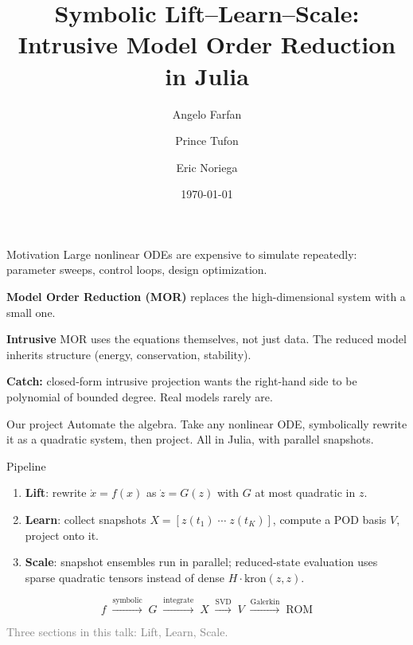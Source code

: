 \documentclass[aspectratio=169,10pt]{beamer}
\title[SymbolicMOR]{Symbolic Lift--Learn--Scale: \\ Intrusive Model Order Reduction in Julia}
\author{Angelo Farfan \and Prince Tufon \and Eric Noriega}
\institute{18.337 Final Project}
\date{\today}
\begin{document}
\begin{frame}
  \titlepage
\end{frame}

\begin{frame}{Motivation}
  Large nonlinear ODEs are expensive to simulate repeatedly: parameter sweeps, control loops, design optimization.

  \medskip
  \textbf{Model Order Reduction (MOR)} replaces the high-dimensional system with a small one.

  \medskip
  \textbf{Intrusive} MOR uses the equations themselves, not just data. The reduced model inherits structure (energy, conservation, stability).

  \medskip
  \textbf{Catch:} closed-form intrusive projection wants the right-hand side to be polynomial of bounded degree. Real models rarely are.

  \medskip
  \begin{block}{Our project}
    Automate the algebra. Take any nonlinear ODE, symbolically rewrite it as a quadratic system, then project. All in Julia, with parallel snapshots.
  \end{block}
\end{frame}

\begin{frame}{Pipeline}
  \begin{enumerate}
    \item \textbf{Lift}: rewrite $\dot{x} = f(x)$ as $\dot{z} = G(z)$ with $G$ at most quadratic in $z$.
    \item \textbf{Learn}: collect snapshots $X = [z(t_1)\;\cdots\;z(t_K)]$, compute a POD basis $V$, project onto it.
    \item \textbf{Scale}: snapshot ensembles run in parallel; reduced-state evaluation uses sparse quadratic tensors instead of dense $H \cdot \mathrm{kron}(z,z)$.
  \end{enumerate}

  \vspace{0.4cm}
  \[
    f \;\xrightarrow{\text{symbolic}}\; G \;\xrightarrow{\text{integrate}}\; X \;\xrightarrow{\text{SVD}}\; V \;\xrightarrow{\text{Galerkin}}\; \text{ROM}
  \]

  \vspace{0.4cm}
  \begin{center}
    \footnotesize
    \textcolor{gray}{Three sections in this talk: Lift, Learn, Scale.}
  \end{center}
\end{frame}
\end{document}
